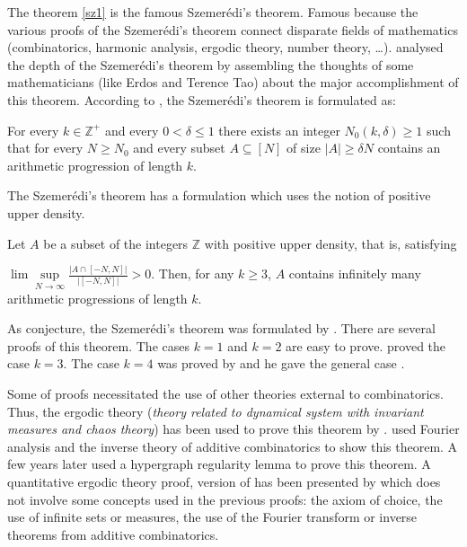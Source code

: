 The  theorem \eqref{sz1} is the famous Szemerédi’s theorem. Famous because the various proofs of the  Szemerédi's theorem connect disparate fields of mathematics (combinatorics, harmonic analysis, ergodic theory,  number theory, \ldots). \cite{arana2015depth} analysed the depth of the  Szemerédi's theorem by assembling the thoughts of some mathematicians (like Erdos and Terence Tao) about the major accomplishment of this theorem. According to \cite{polymath2012new}, the Szemerédi's theorem is formulated as:

\begin{thm}	For every  $k \in \mathbb{Z}^+$ and every $0< \delta \leq  1$ there exists an integer $N_0(k,\delta) \geq 1$ such that for every $N \geq N_0$ and every subset $A \subseteq [N]$ of size $|A|\geq \delta N$ contains an arithmetic progression of length $k.$  \label{sz1} \end{thm}

The Szemerédi's theorem has a formulation which uses the notion of positive upper density. 

Let $A$ be a subset of the integers $\mathbb{Z}$ with positive upper  density, that is, satisfying 

$\lim \sup\limits_{N\rightarrow \infty} \frac{|A \cap[-N,N]|}{|[-N,N]|} > 0.$
Then, for any $k \geq  3$, $A$ contains infinitely many arithmetic progressions of length $k.$

As conjecture, the Szemerédi's theorem was formulated by \cite{JLMS}. There are several proofs of this theorem. The cases $k=1$ and $k=2$ are easy to prove. \cite{roth1953certain, roth1970irregularities} proved the case $k=3.$ The case $k=4$ was proved by \cite{szemeredi1969sets} and he gave the general case \citep{szemeredi1975sets}.

Some of proofs necessitated the use of other theories external to combinatorics. Thus, the ergodic theory (\textit{theory related to dynamical system with invariant measures and chaos theory})  has been used to prove this theorem by \cite*{furstenberg1977ergodic, furstenberg1982ergodic}.
\cite{gowers1998fourier, gowers2001new}  used Fourier analysis and the inverse theory of additive  combinatorics to show this theorem. A few years later \cite{gowers2007hypergraph} used a hypergraph regularity lemma to prove this theorem. A  quantitative ergodic theory proof, version of \cite{furstenberg1982ergodic} has been presented  by \cite{tao2006quantitative} which does not involve some concepts used in the previous proofs: the axiom of choice, the use of infinite sets or measures, the use of the Fourier transform or inverse theorems from additive combinatorics.

